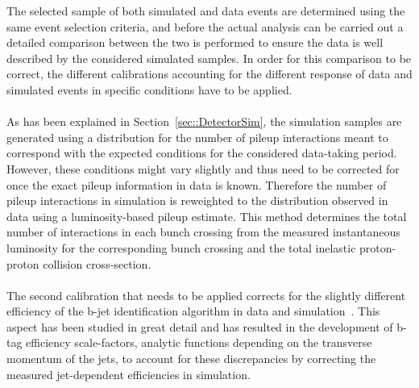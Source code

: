 The selected sample of both simulated and data events are determined using the same event selection criteria, and before the actual analysis can be carried out a detailed comparison between the two is performed to ensure the data is well described by the considered simulated samples.
In order for this comparison to be correct, the different calibrations accounting for the different response of data and simulated events in specific conditions have to be applied.
\\
\\
As has been explained in Section~\ref{sec::DetectorSim}, the simulation samples are generated using a distribution for the number of pileup interactions meant to correspond with the expected conditions for the considered data-taking period. However, these conditions might vary slightly and thus need to be corrected for once the exact pileup information in data is known.
Therefore the number of pileup interactions in simulation is reweighted to the distribution observed in data using a luminosity-based pileup estimate.
This method determines the total number of interactions in each bunch crossing from the measured instantaneous luminosity for the corresponding bunch crossing and the total inelastic proton-proton collision cross-section.
\\
\\
The second calibration that needs to be applied corrects for the slightly different efficiency of the b-jet identification algorithm in data and simulation~\cite{BTagSF}.
This aspect has been studied in great detail and has resulted in the development of b-tag efficiency scale-factors, analytic functions depending on the transverse momentum of the jets, to account for these discrepancies by correcting the measured jet-dependent efficiencies in simulation.
